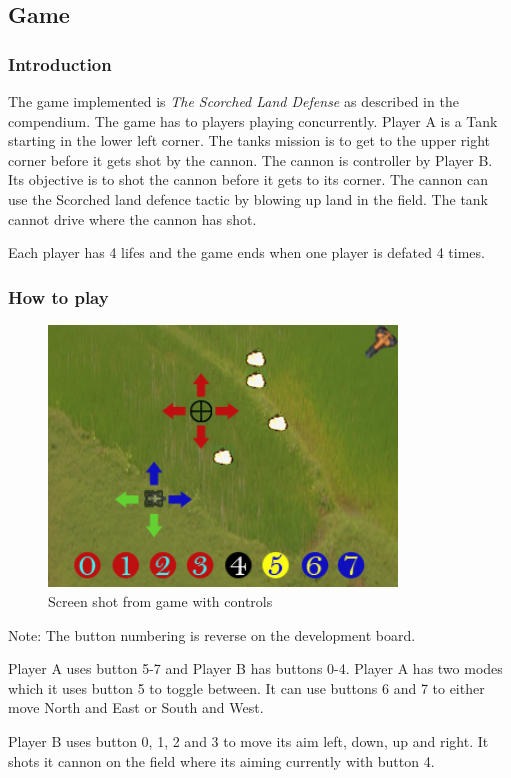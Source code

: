 \subsection{Game}

\subsubsection{Introduction}
The game implemented is {\it The Scorched Land Defense} as described in the compendium. The game has
to players playing concurrently. Player A is a Tank starting in the lower left corner. The tanks
mission is to get to the upper right corner before it gets shot by the cannon. The cannon is
controller by Player B. Its objective is to shot the cannon before it gets to its corner. The cannon
can use the Scorched land defence tactic by blowing up land in the field. The tank cannot drive
where the cannon has shot.

Each player has 4 lifes and the game ends when one player is defated 4 times.

\subsubsection{How to play}

\begin{figure}[h]
  \includegraphics[width=350px]{graphics/buttons_illustration.jpg}
  \caption{Screen shot from game with controls}
\end{figure}

Note: The button numbering is reverse on the development board.

Player A uses button 5-7 and Player B has buttons 0-4. Player A has two modes which it uses button 5
to toggle between. It can use buttons 6 and 7 to either move North and East or South and West.

Player B uses button 0, 1, 2 and 3 to move its aim left, down, up and right. It shots it cannon on
the field where its aiming currently with button 4.
\newpage
